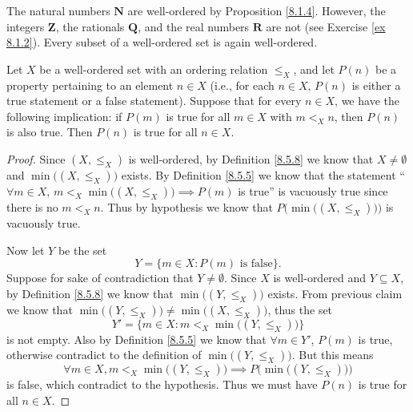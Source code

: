 \begin{example}\label{8.5.9}
    The natural numbers \(\mathbf{N}\) are well-ordered by Proposition \ref{8.1.4}.
    However, the integers \(\mathbf{Z}\), the rationals \(\mathbf{Q}\), and the real numbers \(\mathbf{R}\) are not (see Exercise \ref{ex 8.1.2}).
    Every subset of a well-ordered set is again well-ordered.
\end{example}

\begin{proposition}\label{8.5.10}
    Let \(X\) be a well-ordered set with an ordering relation \(\leq_X\), and let \(P(n)\) be a property pertaining to an element \(n \in X\)
    (i.e., for each \(n \in X\), \(P(n)\) is either a true statement or a false statement).
    Suppose that for every \(n \in X\), we have the following implication:
    if \(P(m)\) is true for all \(m \in X\) with \(m <_X n\), then \(P(n)\) is also true.
    Then \(P(n)\) is true for all \(n \in X\).
\end{proposition}

\begin{proof}
    Since \((X, \leq_X)\) is well-ordered, by Definition \ref{8.5.8} we know that \(X \neq \emptyset\) and \(\min\big((X, \leq_X)\big)\) exists.
    By Definition \ref{8.5.5} we know that the statement ``\(\forall m \in X\), \(m <_X \min\big((X, \leq_X)\big) \implies P(m)\) is true'' is vacuously true since there is no \(m <_X n\).
    Thus by hypothesis we know that \(P\Big(\min\big((X, \leq_X)\big)\Big)\) is vacuously true.

    Now let \(Y\) be the set
    \[
        Y = \{m \in X : P(m) \text{ is false}\}.
    \]
    Suppose for sake of contradiction that \(Y \neq \emptyset\).
    Since \(X\) is well-ordered and \(Y \subseteq X\), by Definition \ref{8.5.8} we know that \(\min\big((Y, \leq_X)\big)\) exists.
    From previous claim we know that \(\min\big((Y, \leq_X)\big) \neq \min\big((X, \leq_X)\big)\), thus the set
    \[
        Y' = \{m \in X : m <_X \min\big((Y, \leq_X)\big)\}
    \]
    is not empty.
    Also by Definition \ref{8.5.5} we know that \(\forall m \in Y'\), \(P(m)\) is true, otherwise contradict to the definition of \(\min\big((Y, \leq_X)\big)\).
    But this means
    \[
        \forall m \in X, m <_X \min\big((Y, \leq_X)\big) \implies P\Big(\min\big((Y, \leq_X)\big)\Big)
    \]
    is false, which contradict to the hypothesis.
    Thus we must have \(P(n)\) is true for all \(n \in X\).
\end{proof}

